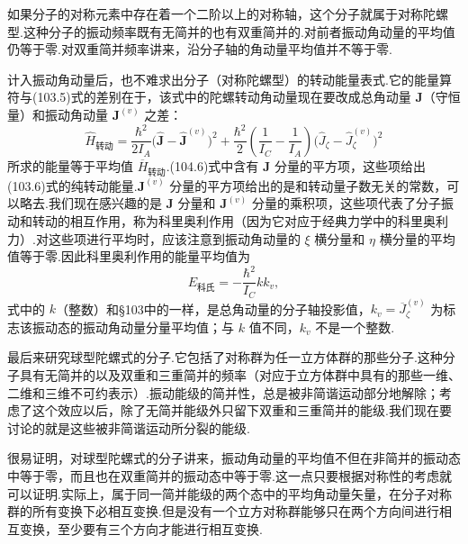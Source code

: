 如果分子的对称元素中存在着一个二阶以上的对称轴，这个分子就属于对称陀螺型.这种分子的振动频率既有无简并的也有双重简并的.对前者振动角动量的平均值仍等于零.对双重简并频率讲来，沿分子轴的角动量平均值并不等于零.

计入振动角动量后，也不难求出分子（对称陀螺型）的转动能量表式.它的能量算符与(103.5)式的差别在于，该式中的陀螺转动角动量现在要改成总角动量 $\boldsymbol{J}$（守恒量）和振动角动量 $\boldsymbol{J}^{(v)}$ 之差：
\begin{equation}
  \hat{H}_{\text{转动}}=\frac{\hbar^2}{2I_A}\big(\hat{\boldsymbol{J}}-\hat{\boldsymbol{J}}^{(v)}\big)^2
  +\frac{\hbar^2}{2}\left(\frac{1}{I_C}-\frac{1}{I_A}\right)
  \big(\hat{J}_\zeta-\hat{J}_\zeta^{(v)}\big)^2
\end{equation}
所求的能量等于平均值 $\overline{H}_{\text{转动}}$.(104.6)式中含有 $\boldsymbol{J}$ 分量的平方项，这些项给出(103.6)式的纯转动能量.$\boldsymbol{J}^{(v)}$ 分量的平方项给出的是和转动量子数无关的常数，可以略去.我们现在感兴趣的是 $\boldsymbol{J}$ 分量和 $\boldsymbol{J}^{(v)}$ 分量的乘积项，这些项代表了分子振动和转动的相互作用，称为科里奥利作用（因为它对应于经典力学中的科里奥利力）.对这些项进行平均时，应该注意到振动角动量的 $\xi$ 横分量和 $\eta$ 横分量的平均值等于零.因此科里奥利作用的能量平均值为
\begin{equation}
  E_{\text{科氏}}=-\frac{\hbar^2}{I_C}kk_v,
\end{equation}
式中的 $k$（整数）和§103中的一样，是总角动量的分子轴投影值，$k_v=\overline{J}^{(v)}_\zeta$ 为标志该振动态的振动角动量分量平均值；与 $k$ 值不同，$k_v$ 不是一个整数.

最后来研究球型陀螺式的分子.它包括了对称群为任一立方体群的那些分子.这种分子具有无简并的以及双重和三重简并的频率（对应于立方体群中具有的那些一维、二维和三维不可约表示）.振动能级的简并性，总是被非简谐运动部分地解除；考虑了这个效应以后，除了无简并能级外只留下双重和三重简并的能级.我们现在要讨论的就是这些被非简谐运动所分裂的能级.

很易证明，对球型陀螺式的分子讲来，振动角动量的平均值不但在非简并的振动态中等于零，而且也在双重简并的振动态中等于零.这一点只要根据对称性的考虑就可以证明.实际上，属于同一简并能级的两个态中的平均角动量矢量，在分子对称群的所有变换下必相互变换.但是没有一个立方对称群能够只在两个方向间进行相互变换，至少要有三个方向才能进行相互变换.

